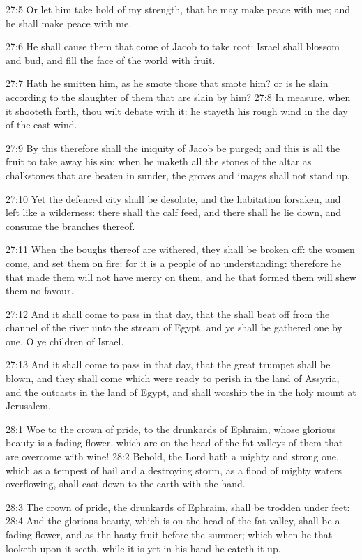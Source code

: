 27:5 Or let him take hold of my strength, that he may make peace with
me; and he shall make peace with me.

27:6 He shall cause them that come of Jacob to take root: Israel shall
blossom and bud, and fill the face of the world with fruit.

27:7 Hath he smitten him, as he smote those that smote him? or is he
slain according to the slaughter of them that are slain by him?  27:8
In measure, when it shooteth forth, thou wilt debate with it: he
stayeth his rough wind in the day of the east wind.

27:9 By this therefore shall the iniquity of Jacob be purged; and this
is all the fruit to take away his sin; when he maketh all the stones
of the altar as chalkstones that are beaten in sunder, the groves and
images shall not stand up.

27:10 Yet the defenced city shall be desolate, and the habitation
forsaken, and left like a wilderness: there shall the calf feed, and
there shall he lie down, and consume the branches thereof.

27:11 When the boughs thereof are withered, they shall be broken off:
the women come, and set them on fire: for it is a people of no
understanding: therefore he that made them will not have mercy on
them, and he that formed them will shew them no favour.

27:12 And it shall come to pass in that day, that the \LORD shall beat
off from the channel of the river unto the stream of Egypt, and ye
shall be gathered one by one, O ye children of Israel.

27:13 And it shall come to pass in that day, that the great trumpet
shall be blown, and they shall come which were ready to perish in the
land of Assyria, and the outcasts in the land of Egypt, and shall
worship the \LORD in the holy mount at Jerusalem.

28:1 Woe to the crown of pride, to the drunkards of Ephraim, whose
glorious beauty is a fading flower, which are on the head of the fat
valleys of them that are overcome with wine!  28:2 Behold, the Lord
hath a mighty and strong one, which as a tempest of hail and a
destroying storm, as a flood of mighty waters overflowing, shall cast
down to the earth with the hand.

28:3 The crown of pride, the drunkards of Ephraim, shall be trodden
under feet: 28:4 And the glorious beauty, which is on the head of the
fat valley, shall be a fading flower, and as the hasty fruit before
the summer; which when he that looketh upon it seeth, while it is yet
in his hand he eateth it up.

